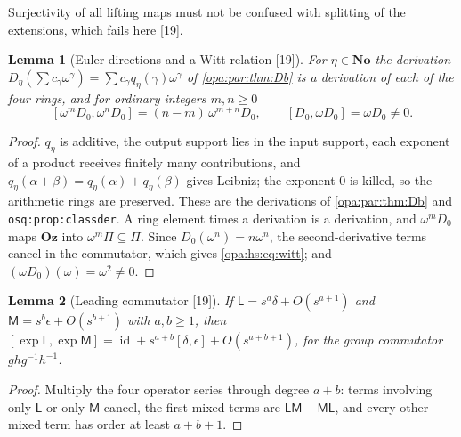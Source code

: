 \documentclass[11pt,oneside]{article}
\numberwithin{equation}{section}
\newtheorem{lemma}[lemma]{Lemma}
\theoremstyle{definition}
\theoremstyle{remark}
\newcommand{\No}{\mathbf{No}}
\newcommand{\Oz}{\mathbf{Oz}}
\newcommand{\id}{\operatorname{id}}
\newcommand{\src}[1]{\textup{\textsf{\small[#1]}}}
\newcommand{\lbl}[1]{\nolinkurl{#1}}
\begin{document}
Surjectivity of all lifting maps must not be confused with splitting of the extensions, which fails here \src{19}.

\begin{lemma}[Euler directions and a Witt relation \src{19}]\label{opa:hs:lem:witt}
For $\eta\in\No$ the derivation $D_\eta(\sum c_\gamma\omega^\gamma)=\sum c_\gamma q_\eta(\gamma)\omega^\gamma$ of \cref{opa:par:thm:Db} is a derivation of each of
the four rings, and for ordinary integers $m,n\ge0$
\begin{equation}\label{opa:hs:eq:witt}
 [\omega^mD_0,\omega^nD_0]=(n-m)\,\omega^{m+n}D_0,\qquad [D_0,\omega D_0]=\omega D_0\ne0 .
\end{equation}
\end{lemma}
\begin{proof}
$q_\eta$ is additive, the output support lies in the input support, each exponent of a product receives finitely many contributions, and
$q_\eta(\alpha+\beta)=q_\eta(\alpha)+q_\eta(\beta)$ gives Leibniz; the exponent $0$ is killed, so the arithmetic rings are preserved. These are the
derivations of \cref{opa:par:thm:Db} and \lbl{osq:prop:classder}. A ring element times a derivation is a derivation, and $\omega^mD_0$ maps $\Oz$ into
$\omega^m\Pi\subseteq\Pi$. Since $D_0(\omega^n)=n\omega^n$, the second-derivative terms cancel in the commutator, which gives \eqref{opa:hs:eq:witt}; and
$(\omega D_0)(\omega)=\omega^2\ne0$.
\end{proof}

\begin{lemma}[Leading commutator \src{19}]\label{opa:hs:lem:commleading}
If $\mathsf L=s^a\delta+O(s^{a+1})$ and $\mathsf M=s^b\epsilon+O(s^{b+1})$ with $a,b\ge1$, then
$[\exp\mathsf L,\exp\mathsf M]=\id+s^{a+b}[\delta,\epsilon]+O(s^{a+b+1})$, for the group commutator $ghg^{-1}h^{-1}$.
\end{lemma}
\begin{proof}
Multiply the four operator series through degree $a+b$: terms involving only $\mathsf L$ or only $\mathsf M$ cancel, the first mixed terms are
$\mathsf L\mathsf M-\mathsf M\mathsf L$, and every other mixed term has order at least $a+b+1$.
\end{proof}
\end{document}

